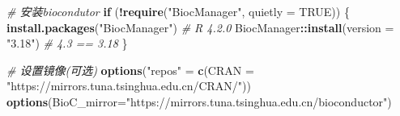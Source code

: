 \documentclass[
]{book}
\newenvironment{Shaded}{\begin{snugshade}}{\end{snugshade}}
\newcommand{\AttributeTok}[1]{\textcolor[rgb]{0.13,0.29,0.53}{#1}}
\newcommand{\CommentTok}[1]{\textcolor[rgb]{0.56,0.35,0.01}{\textit{#1}}}
\newcommand{\ConstantTok}[1]{\textcolor[rgb]{0.56,0.35,0.01}{#1}}
\newcommand{\ControlFlowTok}[1]{\textcolor[rgb]{0.13,0.29,0.53}{\textbf{#1}}}
\newcommand{\FunctionTok}[1]{\textcolor[rgb]{0.13,0.29,0.53}{\textbf{#1}}}
\newcommand{\NormalTok}[1]{#1}
\newcommand{\OtherTok}[1]{\textcolor[rgb]{0.56,0.35,0.01}{#1}}
\newcommand{\SpecialCharTok}[1]{\textcolor[rgb]{0.81,0.36,0.00}{\textbf{#1}}}
\newcommand{\StringTok}[1]{\textcolor[rgb]{0.31,0.60,0.02}{#1}}
\begin{document}
\begin{Shaded}
\begin{Highlighting}[]
\CommentTok{\# 安装biocondutor}
\ControlFlowTok{if}\NormalTok{ (}\SpecialCharTok{!}\FunctionTok{require}\NormalTok{(}\StringTok{"BiocManager"}\NormalTok{, }\AttributeTok{quietly =} \ConstantTok{TRUE}\NormalTok{)) \{}
  \FunctionTok{install.packages}\NormalTok{(}\StringTok{"BiocManager"}\NormalTok{)}
  \CommentTok{\# R 4.2.0}
\NormalTok{  BiocManager}\SpecialCharTok{::}\FunctionTok{install}\NormalTok{(}\AttributeTok{version =} \StringTok{"3.18"}\NormalTok{) }\CommentTok{\# 4.3 == 3.18}
\NormalTok{\}}

\CommentTok{\# 设置镜像(可选)}
\FunctionTok{options}\NormalTok{(}\StringTok{"repos"} \OtherTok{=} \FunctionTok{c}\NormalTok{(}\AttributeTok{CRAN =} \StringTok{"https://mirrors.tuna.tsinghua.edu.cn/CRAN/"}\NormalTok{)) }
\FunctionTok{options}\NormalTok{(}\AttributeTok{BioC\_mirror=}\StringTok{"https://mirrors.tuna.tsinghua.edu.cn/bioconductor"}\NormalTok{)}


\end{Highlighting}
\end{Shaded}
\end{document}

